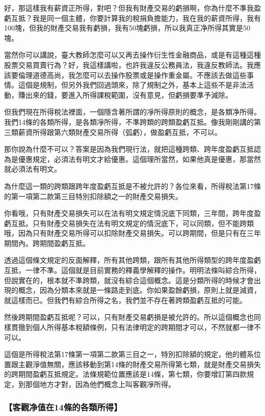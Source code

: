 \documentclass[oneside,sub3section]{ctexbook}
\begin{document}
好，那這樣我有薪資正所得，對吧？但我有財產交易的虧損啊，你為什麼不準我盈虧互抵？我是同一個主體，你要計算我的稅捐負擔能力，我在我的薪資所得，我有100塊，但我的財產交易我有虧損，我有50塊虧損，所以我真正净所得其實是50塊。

當然你可以講說，臺大教師怎麼可以又再去操作衍生性金融商品，或是有這種這種股票交易買賣行為？好，我這樣講啦，也許我違反公務員法，我違反教師法。我應該要倫理道德高尚，我怎麼可以去操作股票或是操作重金屬。不應該去做這些事情。這個是規制，但另外我們回過頭來，除了規制之外，基本上這些不是非法活動，賺出來的錢，要進入所得課稅範圍，沒有意見，但虧損要準予減除。

但我們現在所得稅法裡面，一個隱含著所謂的凈所得原則的概念，是各類净所得。我們14條的各類所得，是各類凈所得，不準跨類的跨類盈虧互抵。像我剛剛講的第三類薪資所得跟第六類財產交易所得（弧虧），做盈虧互抵，不可以。

那你說為什麼不可以？答案是因為我們現行法，就把這種跨類、跨年度盈虧互抵認為是優惠規定，必須法有明文才給優惠。這個理所當然，如果他真是優惠，那當然就必須法有明文。

為什麼這一類的跨類跟跨年度盈虧互抵是不被允許的？各位來看，所得稅法第17條的第一項第二款第三目特別扣除額之一的財產交易損失。

你看哦，只有財產交易損失可以在法有明文規定情況底下同類，三年間，跨年度盈虧互抵。只有財產交易損失在法有明文規定的情況底下，可以同類，但不能跨類哦，因為只有財產交易所得可以扣除財產交易損失。可以跨期間，但是只有在三年期間內。跨期間盈虧互抵。

透過這個條文規定的反面解釋，所有其他跨類，跟所有其他所得類型的跨年度盈虧互抵，一律不準。這個就是目前實務的釋義學解釋的操作。明明法條叫綜合所得，但說實在的，根本就不準跨類，就沒有綜合這個概念。這是分類所得的時候才會出現的概念，因為分類本來就是一條路走到底。你如果盈餘虧損，原則上就是減資，就這樣而已。但我們有綜合所得之名，我們並不存在著跨類盈虧互抵的可能。

然後跨期間盈虧互抵呢？可以，只有財產交易虧損是被允許的。所以這個概念也同樣貫徹到個人所得基本稅額條例，只有法律明定的跨期間才可以，不然就都一律不可以。

這個是所得稅法第17條第一項第二款第三目之一，特別扣除額的規定，他的體系位置跟主觀淨值無關，應該移動到第14條的財產交易所得第七類，就是財產交易損失的跨期間盈虧互抵規定。法條規範位置應該是14條，第七類，你要增訂第四款規定，到那個地方才對，因為他們概念上叫客觀凈所得。

\hypertarget{ux5ba2ux89c0ux51c0ux503cux572814ux689dux7684ux5404ux985eux6240ux5f97}{%
\subsubsection{【客觀净值在14條的各類所得】}\label{ux5ba2ux89c0ux51c0ux503cux572814ux689dux7684ux5404ux985eux6240ux5f97}}
\end{document}
